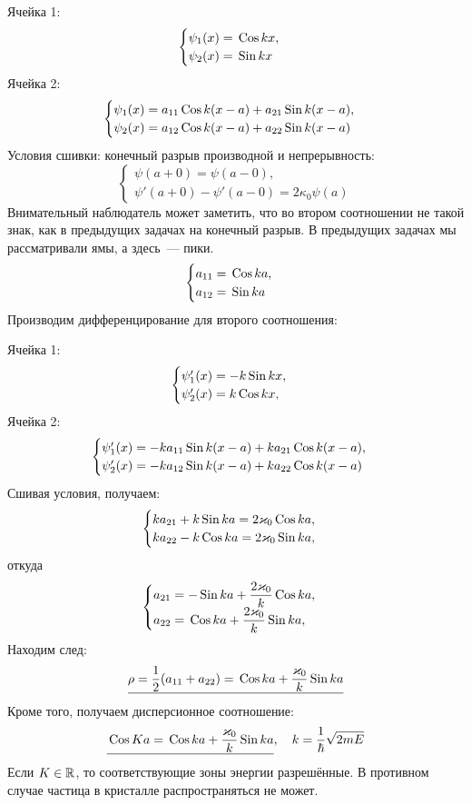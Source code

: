 Ячейка 1:
$$
    \begin{cases}
        \psi_1(x) = \,\mathrm {Cos} \, kx,\\
        \psi_2(x) = \,\mathrm {Sin} \, kx
    \end{cases}
$$
Ячейка 2:
$$
    \begin{cases}
        \psi_1(x) = a_{11} \,\mathrm {Cos} \, k(x-a) + a_{21} \,\mathrm {Sin} \, k(x-a),\\
        \psi_2(x) = a_{12} \,\mathrm {Cos} \, k(x-a) + a_{22} \,\mathrm {Sin} \, k(x-a)
    \end{cases}
$$
Условия сшивки: конечный разрыв производной и непрерывность:
$$
     \begin{cases}
        \psi(a+0) = \psi(a-0),\\
        \psi'(a+0) - \psi'(a-0) = 2\kappa_0 \psi(a)
     \end{cases}
$$
Внимательный наблюдатель может заметить, что во втором соотношении не такой знак, как в предыдущих задачах на конечный разрыв. В предыдущих задачах мы рассматривали ямы, а здесь~--- пики.
$$
    \begin{cases}
        a_{11} = \,\mathrm {Cos} \, ka,\\
        a_{12} = \,\mathrm {Sin} \, ka
    \end{cases}
$$
Производим дифференцирование для второго соотношения:

Ячейка 1:
$$
    \begin{cases}
        \psi_1'(x) = -k \,\mathrm {Sin} \, kx,\\
        \psi_2'(x) = k \,\mathrm {Cos} \, kx,\\
    \end{cases}
$$
Ячейка 2:
$$
    \begin{cases}
        \psi_1'(x) = -k a_{11} \,\mathrm {Sin} \, k(x-a) + k a_{21} \,\mathrm {Cos} \, k(x-a),\\
        \psi_2'(x) = -k a_{12} \,\mathrm {Sin} \, k(x-a) + k a_{22} \,\mathrm {Cos} \, k(x-a)
    \end{cases}
$$
Сшивая условия, получаем:
$$
    \begin{cases}
    k a_{21} + k \,\mathrm {Sin} \, ka = 2 \varkappa_0 \,\mathrm {Cos} \, ka,\\
    k a_{22} - k \,\mathrm {Cos} \, ka = 2 \varkappa_0 \,\mathrm {Sin} \, ka,\\
    \end{cases}
$$
откуда
$$
    \begin{cases}
    a_{21} = -\,\mathrm {Sin} \, ka + \dfrac{2 \varkappa_0}{k} \,\mathrm {Cos} \, ka,\\
    a_{22} = \,\mathrm {Cos} \, ka + \dfrac{2 \varkappa_0}{k} \,\mathrm {Sin} \, ka,
    \end{cases}
$$
Находим след:
$$
    \underline{\rho = \dfrac12 (a_{11} + a_{22} ) = \,\mathrm {Cos} \, ka + \dfrac{\varkappa_0}{k} \,\mathrm {Sin} \, ka}
$$
Кроме того, получаем дисперсионное соотношение:
$$
    \underline{\,\mathrm {Cos} \, Ka = \,\mathrm {Cos} \, ka + \dfrac{\varkappa_0}{k} \,\mathrm {Sin} \, ka}, \quad k = \dfrac{1}{\hbar} \sqrt{2mE}
$$
Если $K \in \mathbb {R}$, то соответствующие зоны энергии разрешённые. В противном случае частица в кристалле распространяться не может.


